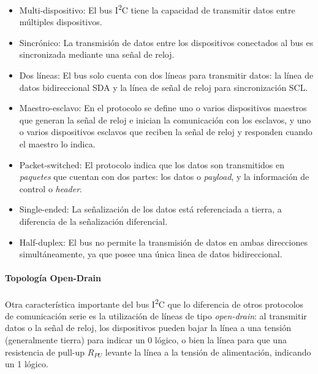 \begin{itemize}
    \item {\Medium Multi-dispositivo:} El bus I\textsuperscript{2}C tiene la capacidad de transmitir datos entre múltiples dispositivos.
    \item {\Medium Sincrónico:} La transmisión de datos entre los dispositivos conectados al bus es sincronizada mediante una señal de reloj.
    \item {\Medium Dos líneas:} El bus solo cuenta con dos líneas para transmitir datos: la línea de datos bidireccional SDA y la línea de señal de reloj para sincronización SCL.
    \item {\Medium Maestro-esclavo:} En el protocolo se define uno o varios dispositivos maestros que generan la señal de reloj e inician la comunicación con los esclavos, y uno o varios dispositivos esclavos que reciben la señal de reloj y responden cuando el maestro lo indica.
    \item {\Medium Packet-switched:} El protocolo indica que los datos son transmitidos en \textit{paquetes} que cuentan con dos partes: los datos o \textit{payload}, y la información de control o \textit{header}.
    \item {\Medium Single-ended:} La señalización de los datos está referenciada a tierra, a diferencia de la señalización diferencial.
    \item {\Medium Half-duplex:} El bus no permite la transmisión de datos en ambas direcciones simultáneamente, ya que posee una única linea de datos bidireccional.\\
\end{itemize}

\paragraph{Topología Open-Drain}

Otra característica importante del bus I\textsuperscript{2}C que lo diferencia de otros protocolos de comunicación serie es la utilización de {\Medium líneas de tipo \textit{open-drain}}: al transmitir datos o la señal de reloj, los dispositivos pueden bajar la línea a una tensión (generalmente tierra) para indicar un 0 lógico, o bien  la línea para que una resistencia de pull-up $R_{PU}$ levante la línea a la tensión de alimentación, indicando un 1 lógico.\\

